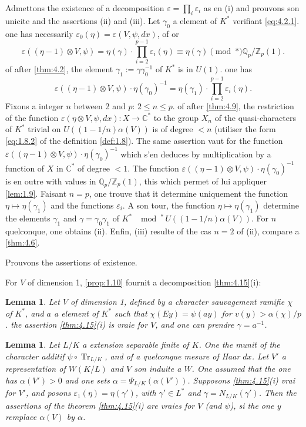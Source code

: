 \documentclass[12pt,a4paper]{article}
\theoremstyle{plain}
\newtheorem{lemma}[theorem]{Lemma}
\theoremstyle{definition}
\theoremstyle{remark}
\DeclareMathOperator{\Tr}{Tr}
\newcommand{\bQ}{\mathbb{Q}}
\newcommand{\bZ}{\mathbb{Z}}
\newcommand{\bC}{\mathbb{C}}
\providecommand{\Tr}{\operatorname{Tr}}
\begin{document}
Admettons the existence of a decomposition $\varepsilon = \prod_i \varepsilon_i$ as en (i) and prouvons son unicite and the assertions (ii) and (iii). Let $\gamma_0$ a element of $K^*$ verifiant \eqref{eq:4.2.1}. one has necessarily $\varepsilon_0(\eta) = \varepsilon(V, \psi, dx)$, of or
\[
\varepsilon((\eta-1) \otimes V, \psi) = \eta(\gamma) \cdot \prod_{i=2}^{p-1} \varepsilon_i(\eta) \equiv \eta(\gamma) \pmod{*} \bQ_p/\bZ_p(1).
\]
of after \ref{thm:4.2}, the element $\gamma_1 := \gamma \gamma_0^{-1}$ of $K^*$ is in $U(1)$. one has
\[
\varepsilon((\eta-1) \otimes V, \psi) \cdot \eta(\gamma_0)^{-1} = \eta(\gamma_1) \cdot \prod_{i=2}^{p-1} \varepsilon_i(\eta).
\]
Fixons a integer $n$ between 2 and $p$: $2 \leq n \leq p$. of after \ref{thm:4.9}, the restriction of the function $\varepsilon(\eta \otimes V, \psi, dx): X \to \bC^*$ to the group $X_n$ of the quasi-characters of $K^*$ trivial on $U((1-1/n)\alpha(V))$ is of degree $< n$ (utiliser the form \eqref{eq:1.8.2} of the definition \ref{def:1.8}). The same assertion vaut for the function $\varepsilon((\eta-1) \otimes V, \psi) \cdot \eta(\gamma_0)^{-1}$ which s'en deduces by multiplication by a function of $X$ in $\bC^*$ of degree $< 1$. The function $\varepsilon((\eta-1) \otimes V, \psi) \cdot \eta(\gamma_0)^{-1}$ is en outre with values in $\bQ_p/\bZ_p(1)$, this which permet of lui appliquer \ref{lem:1.9}. Faisant $n=p$, one trouve that it determine uniquement the function $\eta \mapsto \eta(\gamma_1)$ and the functions $\varepsilon_i$. A son tour, the function $\eta \mapsto \eta(\gamma_1)$ determine the elements $\gamma_1$ and $\gamma = \gamma_0 \gamma_1$ of $K^*$ $\mod^*\, U((1-1/n)\alpha(V))$. For $n$ quelconque, one obtains (ii). Enfin, (iii) resulte of the cas $n=2$ of (ii), compare a \ref{thm:4.6}.

Prouvons the assertions of existence.

For $V$ of dimension 1, \ref{prop:1.10} fournit a decomposition \ref{thm:4.15}(i):

\begin{lemma}\label{lem:4.16}
Let $V$ of dimension 1, defined by a character sauvagement ramifie $\chi$ of $K^*$, and $a$ a element of $K^*$ such that $\chi(Ey) = \psi(ay)$ for $v(y) > \alpha(\chi)/p$. the assertion \ref{thm:4.15}(i) is vraie for $V$, and one can prendre $\gamma = a^{-1}$.
\end{lemma}

\begin{lemma}\label{lem:4.17}
Let $L/K$ a extension separable finite of $K$. One the munit of the character additif $\psi \circ \Tr_{L/K}$, and of a quelconque mesure of Haar $dx$. Let $V'$ a representation of $W(K/L)$ and $V$ son induite a $W$. One assumed that the one has $\alpha(V') > 0$ and one sets $\alpha = \Psi_{L/K}(\alpha(V'))$. Supposons \ref{thm:4.15}(i) vrai for $V'$, and posons $\varepsilon_1(\eta) = \eta(\gamma')$, with $\gamma' \in L^*$ and $\gamma = N_{L/K}(\gamma')$. Then the assertions of the theorem \ref{thm:4.15}(i) are vraies for $V$ (and $\psi$), si the one y remplace $\alpha(V)$ by $\alpha$.
\end{lemma}
\end{document}
